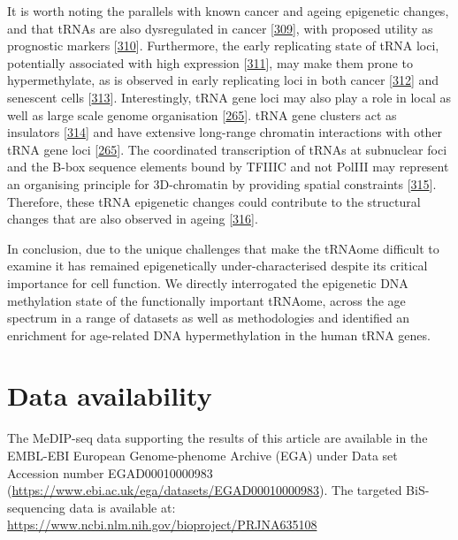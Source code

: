 \documentclass[
]{book}
\begin{document}
It is worth noting the parallels with known cancer and ageing epigenetic changes, and that tRNAs are also dysregulated in cancer {[}\protect\hyperlink{ref-Huang2018}{309}{]}, with proposed utility as prognostic markers {[}\protect\hyperlink{ref-Krishnan2016}{310}{]}.
Furthermore, the early replicating state of tRNA loci, potentially associated with high expression {[}\protect\hyperlink{ref-Muller2017}{311}{]}, may make them prone to hypermethylate, as is observed in early replicating loci in both cancer {[}\protect\hyperlink{ref-Du2019}{312}{]} and senescent cells {[}\protect\hyperlink{ref-Cruickshanks2013}{313}{]}.
Interestingly, tRNA gene loci may also play a role in local as well as large scale genome organisation {[}\protect\hyperlink{ref-VanBortle2017}{265}{]}.
tRNA gene clusters act as insulators {[}\protect\hyperlink{ref-Raab2011}{314}{]} and have extensive long-range chromatin interactions with other tRNA gene loci {[}\protect\hyperlink{ref-VanBortle2017}{265}{]}.
The coordinated transcription of tRNAs at subnuclear foci and the B-box sequence elements bound by TFIIIC and not PolIII may represent an organising principle for 3D-chromatin by providing spatial constraints {[}\protect\hyperlink{ref-Noma2006}{315}{]}.
Therefore, these tRNA epigenetic changes could contribute to the structural changes that are also observed in ageing {[}\protect\hyperlink{ref-Sun2018}{316}{]}.

In conclusion, due to the unique challenges that make the tRNAome difficult to examine it has remained epigenetically under-characterised despite its critical importance for cell function.
We directly interrogated the epigenetic DNA methylation state of the functionally important tRNAome, across the age spectrum in a range of datasets as well as methodologies and identified an enrichment for age-related DNA hypermethylation in the human tRNA genes.

\newpage

\hypertarget{data-availability}{%
\section{Data availability}\label{data-availability}}

The MeDIP-seq data supporting the results of this article are available in the EMBL-EBI European Genome-phenome Archive (EGA) under Data set Accession number EGAD00010000983 (\url{https://www.ebi.ac.uk/ega/datasets/EGAD00010000983}).
The targeted BiS-sequencing data is available at: \url{https://www.ncbi.nlm.nih.gov/bioproject/PRJNA635108}
\end{document}
